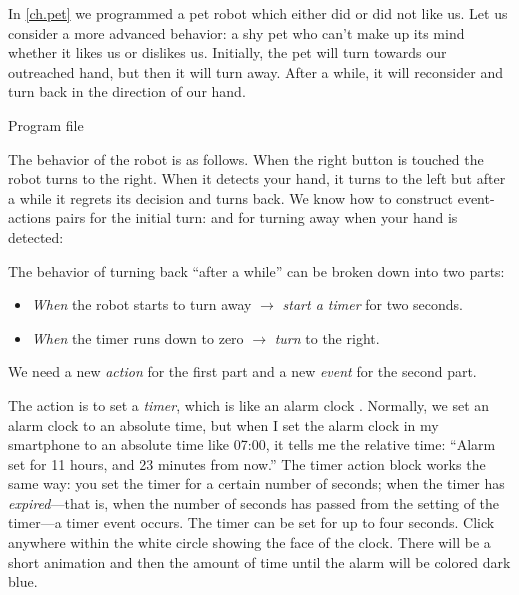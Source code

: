 
\label{ch.time}

In \cref{ch.pet} we programmed a pet robot which either did or did not
like us. Let us consider a more advanced behavior: a shy pet who can't
make up its mind whether it likes us or dislikes us. Initially, the pet
will turn towards our outreached hand, but then it will turn away. After
a while, it will reconsider and turn back in the direction of our hand.

{\raggedleft \hfill Program file }

The behavior of the robot is as follows. When the right button is
touched the robot turns to the right. When it detects your hand, it
turns to the left but after a while it regrets its decision and turns
back. We know how to construct event-actions pairs for the initial turn:
 and for turning away when your hand is detected:

The behavior of turning back ``after a while'' can be broken down into
two parts:

\begin{itemize}

\item \emph{When} the robot starts to turn away $\rightarrow$
\emph{start a timer} for two seconds.

\item \emph{When} the timer runs down to zero $\rightarrow$ \emph{turn}
to the right.

\end{itemize}

We need a new \emph{action} for the first part and a new \emph{event}
for the second part.

The action is to set a \emph{timer}, which is like an alarm clock
. Normally, we set an alarm clock to an absolute
time, but when I set the alarm clock in my smartphone to an absolute
time like 07:00, it tells me the relative time: ``Alarm set for 11
hours, and 23 minutes from now.'' The timer action block works the same
way: you set the timer for a certain number of seconds; when the timer
has \emph{expired}---that is, when the number of seconds has passed from
the setting of the timer---a timer event occurs. The timer can be set
for up to four seconds. Click anywhere within the white circle showing
the face of the clock. There will be a short animation and then the
amount of time until the alarm will be colored dark blue.

